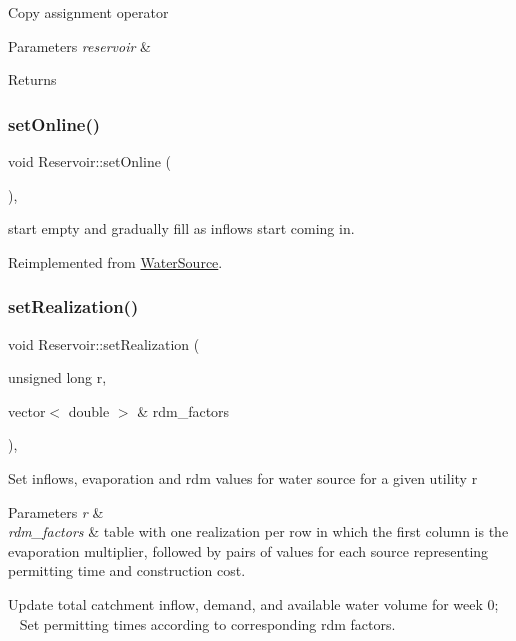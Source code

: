 Copy assignment operator 
\begin{DoxyParams}{Parameters}
{\em reservoir} & \\
\hline
\end{DoxyParams}
\begin{DoxyReturn}{Returns}

\end{DoxyReturn}
\mbox{\label{classReservoir_ac6f64dd92c401e58095e7b125855041b}} 
\subsubsection{\texorpdfstring{set\+Online()}{setOnline()}}
{\footnotesize\ttfamily void Reservoir\+::set\+Online (\begin{DoxyParamCaption}{ }\end{DoxyParamCaption})\hspace{0.3cm}{\ttfamily [override]}, {\ttfamily [virtual]}}

start empty and gradually fill as inflows start coming in. 

Reimplemented from \mbox{\hyperlink{classWaterSource_ab3396e2915db91a6c82e0f29c7889df4}{Water\+Source}}.

\mbox{\label{classReservoir_ad1bb7aa46397719d09e0b6188b9bc28d}} 
\subsubsection{\texorpdfstring{set\+Realization()}{setRealization()}}
{\footnotesize\ttfamily void Reservoir\+::set\+Realization (\begin{DoxyParamCaption}\item[{unsigned long}]{r,  }\item[{vector$<$ double $>$ \&}]{rdm\+\_\+factors }\end{DoxyParamCaption})\hspace{0.3cm}{\ttfamily [override]}, {\ttfamily [virtual]}}

Set inflows, evaporation and rdm values for water source for a given utility r 
\begin{DoxyParams}{Parameters}
{\em r} & \\
\hline
{\em rdm\+\_\+factors} & table with one realization per row in which the first column is the evaporation multiplier, followed by pairs of values for each source representing permitting time and construction cost. \\
\hline
\end{DoxyParams}
Update total catchment inflow, demand, and available water volume for week 0; ~\newline
~\newline
 Set permitting times according to corresponding rdm factors.

